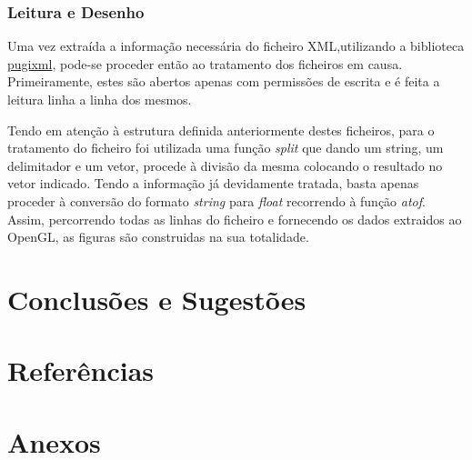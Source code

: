 \documentclass[a4paper]{article}
\begin{document}
\subsubsection{Leitura e Desenho}

\hspace{3mm} Uma vez extraída a informação necessária do ficheiro XML,utilizando a biblioteca \href{https://github.com/zeux/pugixml}{pugixml}, pode-se proceder então ao tratamento dos ficheiros em causa. Primeiramente, estes são abertos apenas com permissões de escrita e é feita a leitura linha a linha dos mesmos.
\par Tendo em atenção à estrutura definida anteriormente destes ficheiros, para o tratamento do ficheiro foi utilizada uma função \emph{split} que dando um string, um delimitador e um vetor, procede à divisão da mesma colocando o resultado no vetor indicado.
Tendo a informação já devidamente tratada, basta apenas proceder à conversão do formato \emph{string} para \emph{float} recorrendo à função \emph{atof}. Assim, percorrendo todas as linhas do ficheiro e fornecendo os dados extraidos ao OpenGL, as figuras são construidas na sua totalidade.

\section{Conclusões e Sugestões}


\section{Referências}


\section{Anexos}
\end{document}
